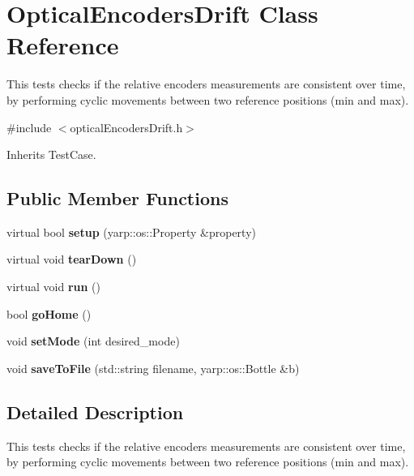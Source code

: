 \section{Optical\+Encoders\+Drift Class Reference}
\label{classOpticalEncodersDrift}


This tests checks if the relative encoders measurements are consistent over time, by performing cyclic movements between two reference positions (min and max).  




{\ttfamily \#include $<$optical\+Encoders\+Drift.\+h$>$}



Inherits Test\+Case.

\subsection*{Public Member Functions}
\begin{DoxyCompactItemize}
\item 
\mbox{\label{classOpticalEncodersDrift_aaf2fb9fd56a67ad676afb53110a7fadd}} 
virtual bool {\bfseries setup} (yarp\+::os\+::\+Property \&property)
\item 
\mbox{\label{classOpticalEncodersDrift_a54fbea332ba8cc678415595243daed45}} 
virtual void {\bfseries tear\+Down} ()
\item 
\mbox{\label{classOpticalEncodersDrift_a92d1a9549df738b811ac64d1606fb4d8}} 
virtual void {\bfseries run} ()
\item 
\mbox{\label{classOpticalEncodersDrift_aa712ab13068e2b998519674dd806dfc6}} 
bool {\bfseries go\+Home} ()
\item 
\mbox{\label{classOpticalEncodersDrift_a21d00ce0925d82329311b9f60b651c5b}} 
void {\bfseries set\+Mode} (int desired\+\_\+mode)
\item 
\mbox{\label{classOpticalEncodersDrift_abc12a0ac22ad701e4ebb23168c115c5c}} 
void {\bfseries save\+To\+File} (std\+::string filename, yarp\+::os\+::\+Bottle \&b)
\end{DoxyCompactItemize}


\subsection{Detailed Description}
This tests checks if the relative encoders measurements are consistent over time, by performing cyclic movements between two reference positions (min and max). 

